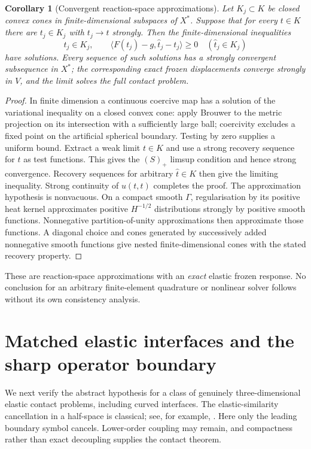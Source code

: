 \documentclass[11pt,a4paper]{article}
\newtheorem{corollary}[theorem]{Corollary}
\theoremstyle{definition}\newtheorem{definition}[theorem]{Definition}
\theoremstyle{remark}\newtheorem{remark}[theorem]{Remark}
\newcommand{\ip}[2]{\langle #1,#2\rangle}
\numberwithin{equation}{section}
\begin{document}
\begin{corollary}[Convergent reaction-space approximations]\label{cor:reactionGalerkin}
Let $K_j\subset K$ be closed convex cones in finite-dimensional subspaces of $X^*$. Suppose that for every $t\in K$ there are $t_j\in K_j$ with $t_j\to t$ strongly. Then the finite-dimensional inequalities
\[
 t_j\in K_j,\qquad\ip{F(t_j)-g}{\widehat t_j-t_j}\ge0
 \quad(\widehat t_j\in K_j)
\]
have solutions. Every sequence of such solutions has a strongly convergent subsequence in $X^*$; the corresponding exact frozen displacements converge strongly in $V$, and the limit solves the full contact problem.
\end{corollary}
\begin{proof}
In finite dimension a continuous coercive map has a solution of the variational inequality on a closed convex cone: apply Brouwer to the metric projection on its intersection with a sufficiently large ball; coercivity excludes a fixed point on the artificial spherical boundary. Testing by zero supplies a uniform bound. Extract a weak limit $t\in K$ and use a strong recovery sequence for $t$ as test functions. This gives the $(S)_+$ limsup condition and hence strong convergence. Recovery sequences for arbitrary $\widehat t\in K$ then give the limiting inequality. Strong continuity of $u(t,t)$ completes the proof.
The approximation hypothesis is nonvacuous. On a compact smooth $\Gamma$, regularisation by its positive heat kernel approximates positive $H^{-1/2}$ distributions strongly by positive smooth functions. Nonnegative partition-of-unity approximations then approximate those functions. A diagonal choice and cones generated by successively added nonnegative smooth functions give nested finite-dimensional cones with the stated recovery property.
\end{proof}
These are reaction-space approximations with an \emph{exact} elastic frozen response. No conclusion for an arbitrary finite-element quadrature or nonlinear solver follows without its own consistency analysis.

\section{Matched elastic interfaces and the sharp operator boundary}\label{sec:matched}
We next verify the abstract hypothesis for a class of genuinely three-dimensional elastic contact problems, including curved interfaces. The elastic-similarity cancellation in a half-space is classical; see, for example, \cite{ArgatovMishuris}. Here only the leading boundary symbol cancels. Lower-order coupling may remain, and compactness rather than exact decoupling supplies the contact theorem.
\end{document}
